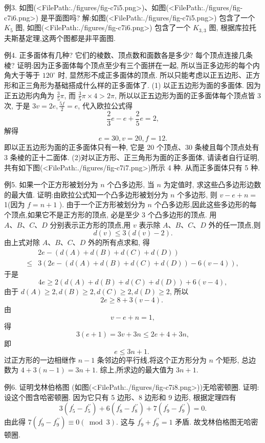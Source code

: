 例3. 如图(<FilePath:./figures/fig-c7i5.png>)、如图(<FilePath:./figures/fig-c7i6.png>) 是平面图吗?
解:如图(<FilePath:./figures/fig-c7i5.png>) 包含了一个 $K_5$ 图, 如图(<FilePath:./figures/fig-c7i6.png>) 包含了一个 $K_{3,3}$ 图, 根据库拉托夫斯基定理,这两个图都是非平面图.



例4. 正多面体有几种? 它们的棱数、顶点数和面数各是多少? 每个顶点连接几条棱?
证明:因为正多面体每个顶点至少有三个面拼在一起, 所以当正多边形的每个内角大于等于 $120^{\circ}$ 时, 显然形不成正多面体的顶点.
所以只能考虑以正五边形、正方形和正三角形为基础搭成什么样的正多面体了.
(1) 以正五边形为面的多面体.
因为正五边形内角为 $\frac{3}{5} \pi$, 而 $\frac{3}{5} \pi \times 4>2 \pi$, 所以以正五边形为面的正多面体每个顶点皆 3 次, 于是 $3 v=2 e, \frac{5 f}{2}=e$, 代入欧拉公式得
$$
\frac{2}{3} e-e+\frac{2}{5} e=2,
$$
解得
$$
e=30, v=20, f=12 .
$$
即以正五边形为面的正多面体只有一种, 它是 20 个顶点、30 条棱且每个顶点处有 3 条棱的正十二面体.
(2)对以正方形、正三角形为面的正多面体, 请读者自行证明,共有如下图(<FilePath:./figures/fig-c7i7.png>)所示 4 种.
从而正多面体只有 5 种.



例5. 如果一个正方形被划分为 $n$ 个凸多边形, 当 $n$ 为定值时, 求这些凸多边形边数的最大值.
证明:由欧拉公式知一个凸多边形被划分为 $n$ 个多边形, 则 $v-e+n=$ 1(因为 $f=n+1$ ).
由于一个正方形被划分为 $n$ 个凸多边形,因此这些多边形的每个顶点,如果它不是正方形的顶点, 必是至少 3 个凸多边形的顶点.
用 $A 、 B 、 C 、 D$ 分别表示正方形的顶点,用 $v$ 表示除 $A 、 B 、 C 、 D$ 外的任一顶点,则
$$
d(v) \leqslant 3(d(v)-2) .
$$
由上式对除 $A 、 B 、 C 、 D$ 外的所有点求和, 得
$$
\begin{aligned}
& 2 e-(d(A)+d(B)+d(C)+d(D)) \\
\leqslant & 3(2 e-(d(A)+d(B)+d(C)+d(D))-6(v-4)),
\end{aligned}
$$
于是
$$
4 e \geqslant 2(d(A)+d(B)+d(C)+d(D))+6(v-4),
$$
由于 $d(A) \geqslant 2, d(B) \geqslant 2, d(C) \geqslant 2, d(D) \geqslant 2$, 所以
$$
2 e \geqslant 8+3(v-4) \text {. }
$$
由
$$
v-e+n=1,
$$
得
$$
3(e+1)=3 v+3 n \leqslant 2 e+4+3 n,
$$
即
$$
e \leqslant 3 n+1 \text {. }
$$
过正方形的一边相继作 $n-1$ 条邻边的平行线,将这个正方形分为 $n$ 个矩形, 总边数为 $4+3(n-1)=3 n+1$.
综上,所求边的最大值为 $3 n+1$.



例6. 证明戈林伯格图 (如图(<FilePath:./figures/fig-c7i8.png>))无哈密顿圈.
证明:设这个图含哈密顿圈.
因为它只有 5 边形、8 边形和 9 边形, 根据定理四有
$$
3\left(f_5^{\prime}-f_5^{\prime \prime}\right)+6\left(f_8^{\prime}-f_8^{\prime \prime}\right)+7\left(f_9^{\prime}-f_9^{\prime \prime}\right)=0 .
$$
由此得 $7\left(f_9^{\prime}-f_9^{\prime \prime}\right) \equiv 0(\bmod 3)$.
这与 $f_9^{\prime}+f_9^{\prime \prime}=1$ 矛盾.
故戈林伯格图无哈密顿圈.


